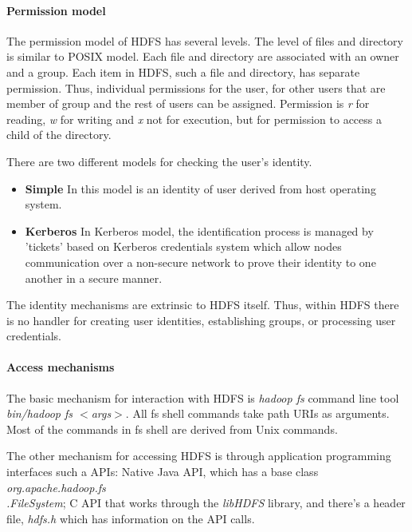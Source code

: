 \documentclass[a4paper,12pt,oneside]{report}
\begin{document}
	\paragraph{Permission model}
	The permission model of HDFS has several levels. The level of files and
	directory is similar to POSIX model. 
	Each file and directory are associated with
	an owner and a group. Each item in HDFS, such a file and directory, has separate
	permission. Thus, individual permissions for the user, for other users that are
	member of group and the rest of users can be assigned. 
	Permission is \textit{r} for reading,
	\textit{w} for writing and \textit{x} not for execution, but for permission to
	access a child of the directory.\cite{permission}
	
	There are two different models for checking the user's identity.
	\begin{itemize}
		\item \textbf{Simple}  In this model is an identity of user derived from host
		operating system.
		\item \textbf{Kerberos} In Kerberos model, the identification process is managed
		by 'tickets' based on Kerberos credentials system which allow nodes communication
		over a non-secure network to prove their identity to one another in a secure
		manner.\cite{kerberos}
	\end{itemize}
	
	The identity mechanisms are  extrinsic to HDFS itself. Thus, within HDFS there is no
	handler for creating user identities, establishing groups, or processing user
	credentials.
	
	\paragraph{Access mechanisms}
	The basic mechanism for interaction with HDFS is \textit{hadoop fs}  command
	line tool \textit{bin/hadoop fs $<$args$>$}. 
	All fs shell commands take path URIs as arguments. Most of the commands in fs
	shell are derived from Unix commands. 
	
	The other mechanism for accessing HDFS is through application programming
	interfaces such a APIs: Native Java API, which has a base class
	\textit{org.apache.hadoop.fs\\.FileSystem}; C API that works through the
	\textit{libHDFS} library, and there's a header file, \textit{hdfs.h} which has
	information on the API calls.
	
\end{document}

